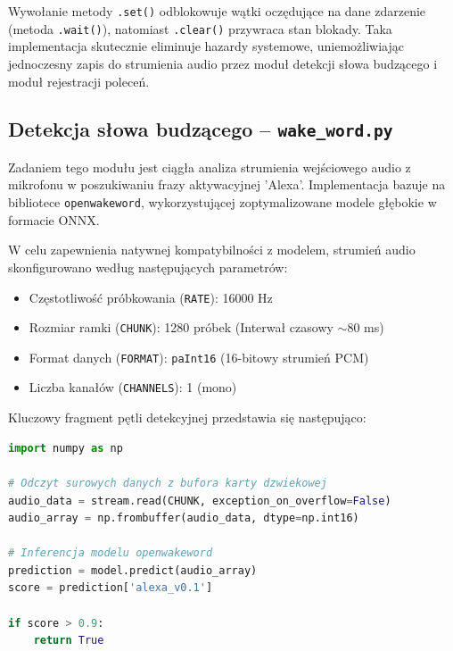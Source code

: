 \documentclass[12pt,a4paper]{article}
\begin{document}
Wywołanie metody \texttt{.set()} odblokowuje wątki oczędujące na dane zdarzenie (metoda \texttt{.wait()}), natomiast \texttt{.clear()} przywraca stan blokady. Taka implementacja skutecznie eliminuje hazardy systemowe, uniemożliwiając jednoczesny zapis do strumienia audio przez moduł detekcji słowa budzącego i moduł rejestracji poleceń.

\subsection{Detekcja słowa budzącego – \texttt{wake\_word.py}}
Zadaniem tego modułu jest ciągła analiza strumienia wejściowego audio z mikrofonu w poszukiwaniu frazy aktywacyjnej 'Alexa'. Implementacja bazuje na bibliotece \texttt{openwakeword}, wykorzystującej zoptymalizowane modele głębokie w formacie ONNX.

\medbreak

W celu zapewnienia natywnej kompatybilności z modelem, strumień audio skonfigurowano według następujących parametrów:
\begin{itemize}
    \item Częstotliwość próbkowania (\texttt{RATE}): 16000 Hz
    \item Rozmiar ramki (\texttt{CHUNK}): 1280 próbek (Interwał czasowy $\sim$80 ms)
    \item Format danych (\texttt{FORMAT}): \texttt{paInt16} (16-bitowy strumień PCM)
    \item Liczba kanałów (\texttt{CHANNELS}): 1 (mono)
\end{itemize}

Kluczowy fragment pętli detekcyjnej przedstawia się następująco:

\begin{center}
\begin{minipage}{0.85\textwidth}
\begin{lstlisting}[language=Python]
import numpy as np

# Odczyt surowych danych z bufora karty dzwiekowej
audio_data = stream.read(CHUNK, exception_on_overflow=False)
audio_array = np.frombuffer(audio_data, dtype=np.int16)

# Inferencja modelu openwakeword
prediction = model.predict(audio_array)
score = prediction['alexa_v0.1']

if score > 0.9:
    return True
\end{lstlisting}
\end{minipage}
\end{center}
\end{document}
